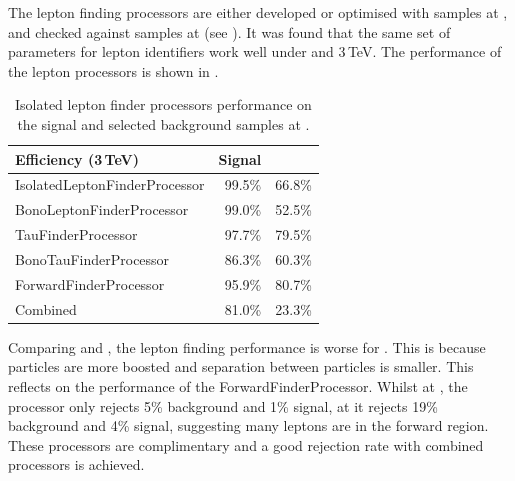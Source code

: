 The lepton finding processors are either developed or optimised with samples at , and checked against samples at  (see ).  It was found that the same set of parameters for lepton identifiers work well under  and 3\,TeV. The performance of the lepton processors is shown in .

\begin{table}[!tbp]
\begin{tabular}{lrr}
\hline
\hline
Efficiency (3\,TeV)  &  Signal  & \HepProcess{\Pep \Pem \to \Pquark\Pquark\Pquark\Pquark\Plepton\Pnu} \\
\hline
IsolatedLeptonFinderProcessor & 99.5\% & 66.8\%  \\
BonoLeptonFinderProcessor & 99.0\% & 52.5\%  \\
TauFinderProcessor & 97.7\% & 79.5\%  \\
BonoTauFinderProcessor & 86.3\% & 60.3\%  \\
ForwardFinderProcessor & 95.9\% & 80.7\%  \\
\hline
Combined & 81.0\% & 23.3\%  \\
\hline
\hline

\end{tabular}
\caption{Isolated lepton finder processors performance on the signal and selected background samples at .}
\label{tab:doubleHiggs3TeVIsoLepPerformance}
\end{table}




Comparing  and , the lepton finding performance is worse for . This is because particles are more boosted and separation between particles is smaller. This reflects on the performance of the  ForwardFinderProcessor. Whilst at , the processor only rejects 5\% background and 1\% signal, at  it rejects 19\% background and 4\% signal, suggesting many leptons are in the forward region. These processors are complimentary and a good rejection rate with combined processors is achieved.

